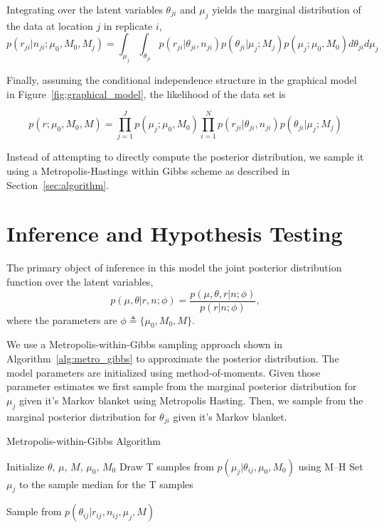\documentclass[11pt,reqno]{amsart}
\begin{document}
Integrating over the latent variables $\theta_{ji}$ and $\mu_j$ yields the marginal distribution of the data at location $j$ in replicate $i$, 
\begin{equation}
p \left( r_{ji} | n_{ji} ; \mu_0, M_0, M_j \right) = \int_{\mu_j} \int_{\theta_{ji}}  p \left( r_{ji} | \theta_{ji}, n_{ji} \right) p\left( \theta_{ji} | \mu_j; M_j \right) p\left( \mu_j; \mu_0, M_0 \right) d\theta_{ji} d\mu_j
\end{equation}

Finally, assuming the conditional independence structure in the graphical model in Figure~\ref{fig:graphical_model}, the likelihood of the data set is

\begin{equation}
p \left( r ; \mu_0, M_0, M \right) = \prod_{j=1}^J p\left( \mu_j; \mu_0, M_0 \right) \prod_{i=1}^N p \left( r_{ji} | \theta_{ji}, n_{ji} \right) p\left( \theta_{ji} | \mu_j; M_j \right) 
\end{equation}

Instead of attempting to directly compute the posterior distribution, we sample it using a Metropolis-Hastings within Gibbs scheme as described in Section~\ref{sec:algorithm}.

\section{Inference and Hypothesis Testing}

The primary object of inference in this model the joint posterior distribution function over the latent variables,
\begin{equation}
	p(\mu, \theta | r, n; \phi)  = \frac{ p(\mu, \theta, r | n; \phi) } {p ( r | n; \phi)},
\end{equation}
where the parameters are $\phi \triangleq \{\mu_0, M_0, M\}$.

We use a Metropolis-within-Gibbs sampling approach shown in Algorithm~\ref{alg:metro_gibbs} to approximate the posterior distribution. The model parameters are initialized using method-of-moments. Given those parameter estimates we first sample from the marginal posterior distribution for $\mu_j$ given it's Markov blanket using Metropolis Hasting. Then, we sample from the marginal posterior distribution for $\theta_{ji}$ given it's Markov blanket.

\begin{algorithm}[ht]
\caption{Metropolis-within-Gibbs Algorithm}
\label{alg:metro_gibbs}
\begin{algorithmic}[1]

\State Initialize $\theta$, $\mu$, $M$, $\mu_0$, $M_0$
\Repeat
{} 
  \State Draw T samples from $p \left( \mu_j |\theta_{ij},\mu_0,M_0\right)$ using M--H
  \State Set $\mu_j$ to the sample median for the T samples
  
  
   
	\State Sample from $p \left( \theta_{ij} |r_{ij},n_{ij},\mu_j,M \right)$
  \EndFor

\EndFor
{}
\end{algorithmic}
\end{algorithm}
\end{document}
